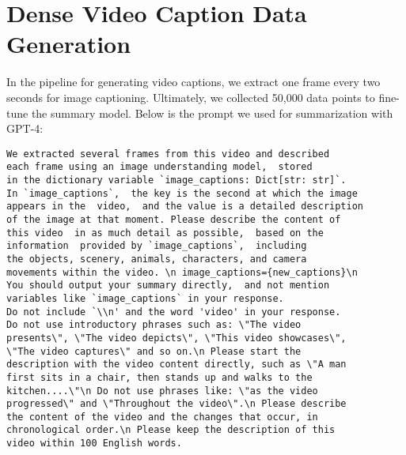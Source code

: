 \section{Dense Video Caption Data Generation}
\label{ap:video_caption_gen}

In the pipeline for generating video captions, we extract one frame every two seconds for image captioning. Ultimately, we collected 50,000 data points to fine-tune the summary model. Below is the prompt we used for summarization with GPT-4:
\begin{promptbox}
\noindent
\begin{verbatim}
We extracted several frames from this video and described 
each frame using an image understanding model,  stored 
in the dictionary variable `image_captions: Dict[str: str]`.  
In `image_captions`,  the key is the second at which the image 
appears in the  video,  and the value is a detailed description 
of the image at that moment. Please describe the content of 
this video  in as much detail as possible,  based on the 
information  provided by `image_captions`,  including 
the objects, scenery, animals, characters, and camera 
movements within the video. \n image_captions={new_captions}\n 
You should output your summary directly,  and not mention
variables like `image_captions` in your response. 
Do not include `\\n' and the word 'video' in your response.  
Do not use introductory phrases such as: \"The video 
presents\", \"The video depicts\", \"This video showcases\", 
\"The video captures\" and so on.\n Please start the 
description with the video content directly, such as \"A man
first sits in a chair, then stands up and walks to the 
kitchen....\"\n Do not use phrases like: \"as the video 
progressed\" and \"Throughout the video\".\n Please describe 
the content of the video and the changes that occur, in 
chronological order.\n Please keep the description of this 
video within 100 English words.
\end{verbatim}
\end{promptbox}

